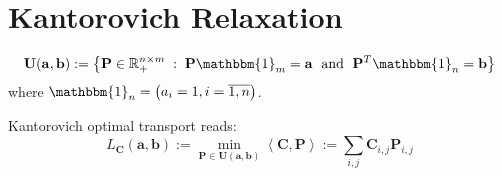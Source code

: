 \section{Kantorovich Relaxation}

$$
\mathbf{U}(\mathbf{a}, \mathbf{b}) := \left\{
\mathbf{P} \in \mathbb{R}_{+}^{n\times m} \; : \;
\mathbf{P} \mathbbm{1}_{m} = \mathbf{a}
\; \text { and } \;
\mathbf{P}^{T} \mathbbm{1}_{n} = \mathbf{b}
\right\}
$$
where $ \mathbbm{1}_{n} = \begin{pmatrix} a_{i} = 1, i = \overline{1, n} \end{pmatrix} $.

Kantorovich optimal transport reads:
$$
L_{\mathbf{C}}(\mathbf{a}, \mathbf{b}) :=
\min_{\mathbf{P} \in \mathbf{U}(\mathbf{a}, \mathbf{b})}
\left< \mathbf{C}, \mathbf{P} \right> :=
\sum_{i, j} \mathbf{C}_{i,j} \mathbf{P}_{i,j}
$$
